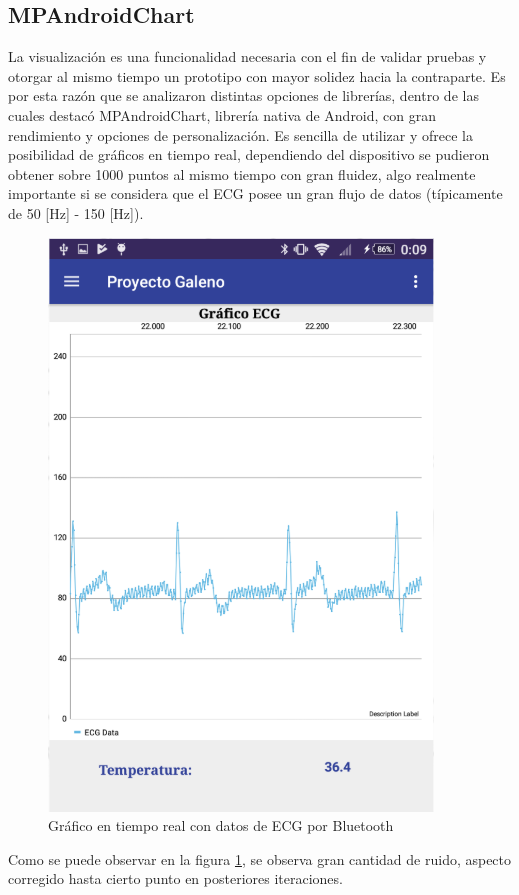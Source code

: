 \subsection{MPAndroidChart}

La visualización es una funcionalidad necesaria con el fin de validar pruebas y otorgar al mismo tiempo un prototipo con mayor solidez hacia la contraparte. Es por esta razón que se analizaron distintas opciones de librerías, dentro de las cuales destacó MPAndroidChart, librería nativa de Android, con gran rendimiento y opciones de personalización. Es sencilla de utilizar y ofrece la posibilidad de gráficos en tiempo real, dependiendo del dispositivo se pudieron obtener sobre 1000 puntos al mismo tiempo con gran fluidez, algo realmente importante si se considera que el ECG posee un gran flujo de datos (típicamente de 50 [Hz] - 150 [Hz]).

\begin{figure}[H]
	\centering
	\includegraphics[scale=1]{figuras/proto1/graph.png}
	\caption{Gráfico en tiempo real con datos de ECG por Bluetooth}
	\label{graph}
\end{figure}

Como se puede observar en la figura \ref{graph}, se observa gran cantidad de ruido, aspecto corregido hasta cierto punto en posteriores iteraciones.

